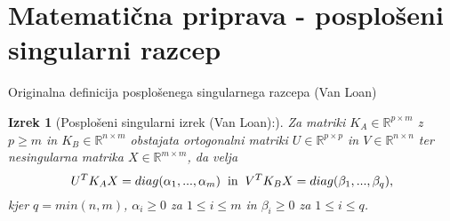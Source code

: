 \documentclass[mat1]{article}
\newtheorem{izrek}{Izrek}
\begin{document}
\section{Matematična priprava - posplošeni singularni razcep}
Originalna definicija posplošenega singularnega razcepa (Van Loan)
\begin{izrek}[Posplošeni singularni izrek (Van Loan):]
\label{izrek:SVD} Za matriki $K_A \in \mathbb{R}^{p \times m}$ z $p \geq m$ in $K_B \in \mathbb{R}^{n \times m}$ obstajata ortogonalni matriki $U \in \mathbb{R}^{p \times p}$ in $V \in \mathbb{R}^{n \times n}$ ter nesingularna matrika $X \in \mathbb{R}^{m \times m}$, da velja 
$$ U^T K_A X = diag(\alpha_1,..., \alpha_m) \hspace{2mm} \text{in} \hspace{2mm} V^T K_B X = diag(\beta_1,..., \beta_q) \text{,}
$$ kjer $q = min(n,m)$, $\alpha_i \geq 0$ za $1 \leq i \leq m$ in  $\beta_i \geq 0$ za  $1 \leq i \leq q$.
\end{izrek}
\end{document}
